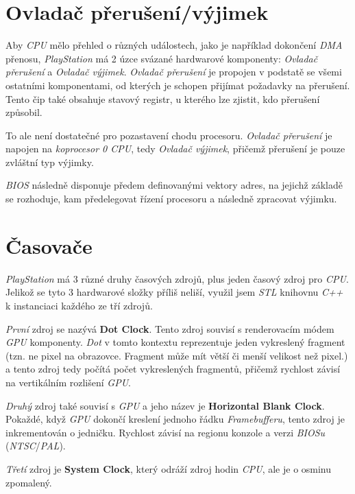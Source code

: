 \section{Ovladač přerušení/výjimek}

Aby \textit{CPU} mělo přehled o různých událostech, jako je například dokončení \textit{DMA} přenosu, 
\textit{PlayStation} má 2 úzce svázané hardwarové komponenty: \textit{Ovladač přerušení} a \textit{Ovladač výjimek}. 
\textit{Ovladač přerušení} je propojen v podstatě se všemi ostatními komponentami, od kterých je schopen přijímat požadavky na přerušení. 
Tento čip také obsahuje stavový registr, u kterého lze zjistit, kdo přerušení způsobil.

To ale není dostatečné pro pozastavení chodu procesoru. 
\textit{Ovladač přerušení} je napojen na \textit{koprocesor 0 CPU}, tedy \textit{Ovladač výjimek}, 
přičemž přerušení je pouze zvláštní typ výjimky.

\textit{BIOS} následně disponuje předem definovanými vektory adres, na jejichž základě se rozhoduje, 
kam předelegovat řízení procesoru a následně zpracovat výjimku.

\section{Časovače}

\textit{PlayStation} má 3 různé druhy časových zdrojů, plus jeden časový zdroj pro \textit{CPU}. 
Jelikož se tyto 3 hardwarové složky příliš neliší, využil jsem \textit{STL} knihovnu \textit{C++} k instanciaci každého ze tří zdrojů.

\textit{První} zdroj se nazývá \textbf{Dot Clock}. Tento zdroj souvisí s renderovacím módem \textit{GPU} komponenty. 
\textit{Dot} v tomto kontextu reprezentuje jeden vykreslený fragment (tzn. ne pixel na obrazovce. Fragment může mít větší či menší velikost než pixel.) a tento 
zdroj tedy počítá počet vykreslených fragmentů, přičemž rychlost závisí na vertikálním rozlišení \textit{GPU}.

\textit{Druhý} zdroj také souvisí s \textit{GPU} a jeho název je \textbf{Horizontal Blank Clock}. 
Pokaždé, když \textit{GPU} dokončí kreslení jednoho řádku \textit{Framebufferu}, tento zdroj je inkrementován o jedničku. 
Rychlost závisí na regionu konzole a verzi \textit{BIOSu} (\textit{NTSC}/\textit{PAL}).

\textit{Třetí} zdroj je \textbf{System Clock}, který odráží zdroj hodin \textit{CPU}, ale je o osminu zpomalený.

